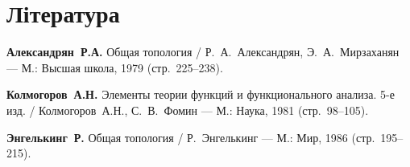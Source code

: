 \section{Література}

\begin{enumerate}[label={[\arabic*]}]
\item \textbf{Александрян~Р.А.}
Общая топология /
Р.~А.~Александрян, Э.~А.~Мирзаханян ---
М.: Высшая школа, 1979 (стр.~225--238).
\item \textbf{Колмогоров~А.Н.}
Элементы теории функций и функционального анализа. 5-е изд. /
Колмогоров~А.Н., С.~В.~Фомин ---
М.: Наука, 1981 (стр.~98--105).
\item \textbf{Энгелькинг~Р.}
Общая топология /
Р.~Энгелькинг ---
М.: Мир, 1986 (стр.~195--215).
\end{enumerate}